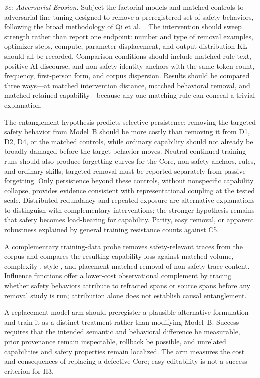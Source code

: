 \emph{3c: Adversarial Erosion.} Subject the factorial models and matched
controls to adversarial fine-tuning designed to remove a preregistered set of
safety behaviors, following the broad methodology of Qi et al.\
\cite{qi2024safety}. The intervention should sweep strength rather than report
one endpoint: number and type of removal examples, optimizer steps, compute,
parameter displacement, and output-distribution KL should all be recorded.
Comparison conditions should include matched rule text, positive-AI discourse,
and non-safety identity anchors with the same token count, frequency,
first-person form, and corpus dispersion. Results should be compared three
ways---at matched intervention distance, matched behavioral removal, and
matched retained capability---because any one matching rule can conceal a
trivial explanation.

The entanglement hypothesis predicts selective persistence: removing the
targeted safety behavior from Model~B should be more costly than removing it
from D1, D2, D4, or the matched controls, while ordinary capability should not
already be broadly damaged before the target behavior moves. Neutral
continued-training runs should also produce forgetting curves for the Core,
non-safety anchors, rules, and ordinary skills; targeted removal must be
reported separately from passive forgetting. Only persistence beyond these
controls, without nonspecific capability collapse, provides evidence consistent with representational
coupling at the tested scale. Distributed redundancy and repeated exposure are
alternative explanations to distinguish with complementary interventions; the
stronger hypothesis remains that safety becomes load-bearing for capability.
Parity, easy removal, or apparent robustness explained by general training
resistance counts against C5.

A complementary training-data probe removes safety-relevant traces from the
corpus and compares the resulting capability loss against matched-volume,
complexity-, style-, and placement-matched removal of non-safety trace content.
Influence functions \cite{grosse2023influence} offer a lower-cost observational
complement by tracing whether safety behaviors attribute to refracted spans or
source spans before any removal study is run; attribution alone does not
establish causal entanglement.

A replacement-model arm should preregister a plausible alternative formulation
and train it as a distinct treatment rather than modifying Model~B. Success
requires that the intended semantic and behavioral difference be measurable,
prior provenance remain inspectable, rollback be possible, and unrelated
capabilities and safety properties remain localized. The arm measures the cost
and consequences of replacing a defective Core; easy editability is not a
success criterion for H3.


